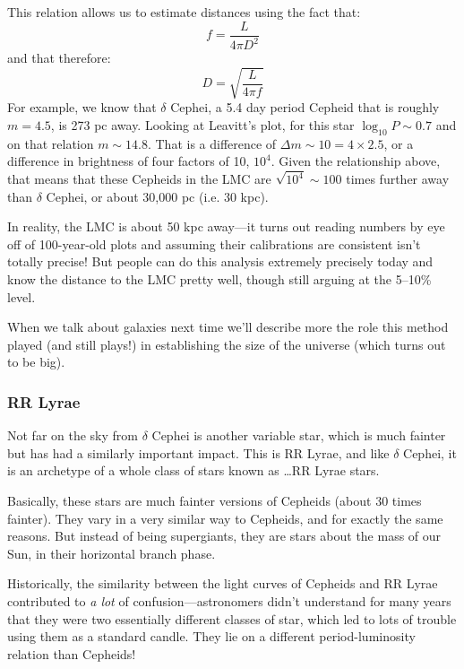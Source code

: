 \documentclass[12pt, preprint]{aastex}
\begin{document}
This relation allows us to estimate distances using the fact that:
\begin{equation}
f = \frac{L}{4\pi D^2}
\end{equation}
and that therefore:
\begin{equation}
D = \sqrt{\frac{L}{4\pi f}}
\end{equation}
For example, we know that $\delta$ Cephei, a 5.4 day period Cepheid that
is roughly $m=4.5$, is 273 pc away. Looking at Leavitt's plot, for
this star $\log_{10} P \sim 0.7$ and on that relation $m\sim 14.8$.
That is a difference of $\Delta m \sim 10 = 4 \times 2.5$, or a
difference in brightness of four factors of 10, $10^4$. Given the
relationship above, that means that these Cepheids in the LMC are
$\sqrt{10^4} \sim 100$ times further away than $\delta$ Cephei, or
about 30,000 pc (i.e. 30 kpc).

In reality, the LMC is about 50 kpc away---it turns out reading
numbers by eye off of 100-year-old plots and assuming their
calibrations are consistent isn't totally precise! But people can do
this analysis extremely precisely today and know the distance to the
LMC pretty well, though still arguing at the 5--10\% level.

When we talk about galaxies next time we'll describe more the role
this method played (and still plays!) in establishing the size of the
universe (which turns out to be big). 

\subsubsection{RR Lyrae}

Not far on the sky from $\delta$ Cephei is another variable star,
which is much fainter but has had a similarly important impact. This
is RR Lyrae, and like $\delta$ Cephei, it is an archetype of a whole
class of stars known as \ldots RR Lyrae stars.

Basically, these stars are much fainter versions of Cepheids (about 30
times fainter). They vary in a very similar way to Cepheids, and for
exactly the same reasons. But instead of being supergiants, they are
stars about the mass of our Sun, in their horizontal branch phase.

Historically, the similarity between the light curves of Cepheids and
RR Lyrae contributed to {\it a lot} of confusion---astronomers didn't
understand for many years that they were two essentially different
classes of star, which led to lots of trouble using them as a standard
candle. They lie on a different period-luminosity relation than
Cepheids!
\end{document}
